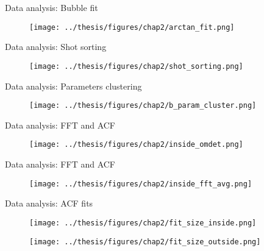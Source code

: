\documentclass[handout]{beamer}
\begin{document}
\begin{frame}{Data analysis: Bubble fit}
    \begin{figure}
        \centering
        \texttt{[image: ../thesis/figures/chap2/arctan\_fit.png]}
    \end{figure}
\end{frame}

\begin{frame}{Data analysis: Shot sorting}
    \begin{figure}
        \centering
        \texttt{[image: ../thesis/figures/chap2/shot\_sorting.png]}
    \end{figure}
\end{frame}

\begin{frame}{Data analysis: Parameters clustering}
    \begin{figure}
        \centering
        \texttt{[image: ../thesis/figures/chap2/b\_param\_cluster.png]}
    \end{figure}
\end{frame}

\begin{frame}{Data analysis: FFT and ACF}
    \begin{figure}
        \centering
        \texttt{[image: ../thesis/figures/chap2/inside\_omdet.png]}
    \end{figure}
\end{frame}

\begin{frame}{Data analysis: FFT and ACF}
    \begin{figure}
        \centering
        \texttt{[image: ../thesis/figures/chap2/inside\_fft\_avg.png]}
    \end{figure}
\end{frame}

\begin{frame}{Data analysis: ACF fits}
    \begin{figure}
        \centering
        \texttt{[image: ../thesis/figures/chap2/fit\_size\_inside.png]}
    \end{figure}
    \vspace{-0.5cm}
    \begin{figure}
        \centering
        \texttt{[image: ../thesis/figures/chap2/fit\_size\_outside.png]}
    \end{figure}
\end{frame}
\end{document}
